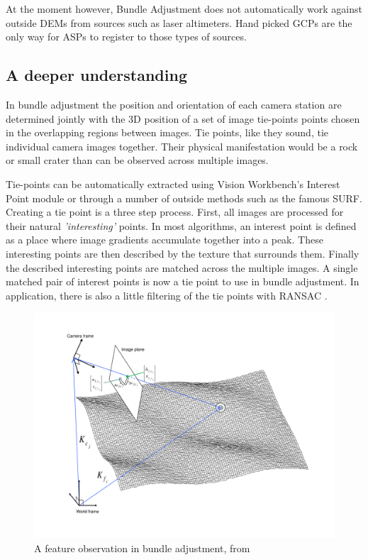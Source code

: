 At the moment however, Bundle Adjustment does not automatically work
against outside DEMs from sources such as laser altimeters. Hand
picked \acp{GCP} are the only way for \acp{ASP} to register to those
types of sources.

\subsection{A deeper understanding}

In bundle adjustment the position and orientation of each camera
station are determined jointly with the 3D position of a set of image
tie-points points chosen in the overlapping regions between
images. Tie points, like they sound, tie individual camera images
together. Their physical manifestation would be a rock or small crater
than can be observed across multiple images.

Tie-points can be automatically extracted using Vision Workbench's
Interest Point module or through a number of outside methods such as
the famous SURF\citep{surf08}. Creating a tie point is a three step
process. First, all images are processed for their natural {\it
  'interesting'} points. In most algorithms, an interest point is
defined as a place where image gradients accumulate together into a
peak. These interesting points are then described by the texture that
surrounds them. Finally the described interesting points are matched
across the multiple images. A single matched pair of interest points
is now a tie point to use in bundle adjustment. In application, there
is also a little filtering of the tie points with RANSAC
\citep{fischler81}.

\begin{figure}[b!]
  \begin{center}
  \includegraphics[trim=20mm 20mm 20mm 15mm,clip,width=6in]{images/ba_feature_observation.pdf}
  \end{center}
  \caption{ A feature observation in bundle adjustment, from \citet{moore09} }
  \label{fig:ba_feature}
\end{figure}

